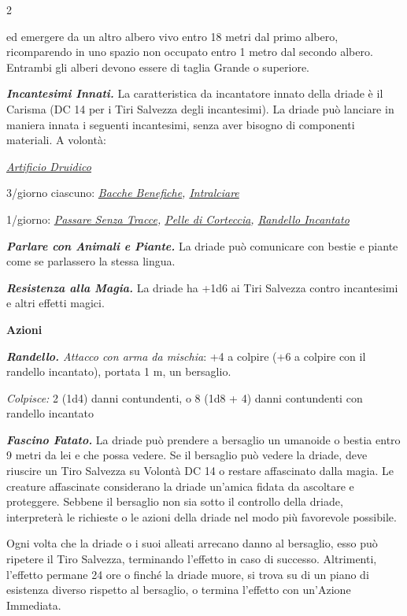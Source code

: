 \begin{multicols}{2}
{ed emergere da un altro albero vivo entro 18 metri dal primo albero, ricomparendo in uno spazio non occupato entro 1 metro dal secondo albero. Entrambi gli alberi devono essere di taglia Grande o superiore.

\emph{\textbf{Incantesimi Innati.}} La caratteristica da incantatore innato della driade è il Carisma (DC 14 per i Tiri Salvezza degli incantesimi). La driade può lanciare in maniera innata i seguenti incantesimi, senza aver bisogno di componenti materiali. A volontà:

\emph{\hyperlink{Artificio Druidico}{Artificio Druidico}}

3/giorno ciascuno: \emph{\hyperlink{Bacche Benefiche}{Bacche Benefiche}, \hyperlink{Intralciare}{Intralciare}}

1/giorno: \emph{\hyperlink{Passare Senza Tracce}{Passare Senza Tracce}, \hyperlink{Pelle di Corteccia}{Pelle di Corteccia}, \hyperlink{Randello Incantato}{Randello Incantato}}

\emph{\textbf{Parlare con Animali e Piante.}} La driade può comunicare con bestie e piante come se parlassero la stessa lingua.

\emph{\textbf{Resistenza alla Magia.}} La driade ha +1d6 ai Tiri Salvezza contro incantesimi e altri effetti magici.


\textbf{Azioni}

\emph{\textbf{Randello.} Attacco con arma da mischia}: +4 a colpire (+6 a colpire con il randello incantato), portata 1 m, un bersaglio.

\emph{Colpisce:} 2 (1d4) danni contundenti, o 8 (1d8 + 4) danni contundenti con randello incantato

\emph{\textbf{Fascino Fatato.}} La driade può prendere a bersaglio un umanoide o bestia entro 9 metri da lei e che possa vedere. Se il bersaglio può vedere la driade, deve riuscire un Tiro Salvezza su Volontà DC 14 o restare affascinato dalla magia. Le creature affascinate considerano la driade un'amica fidata da ascoltare e proteggere. Sebbene il bersaglio non sia sotto il controllo della driade, interpreterà le richieste o le azioni della driade nel modo più favorevole possibile.

Ogni volta che la driade o i suoi alleati arrecano danno al bersaglio, esso può ripetere il Tiro Salvezza, terminando l'effetto in caso di successo. Altrimenti, l'effetto permane 24 ore o finché la driade muore, si trova su di un piano di esistenza diverso rispetto al bersaglio, o termina l'effetto con un'Azione Immediata.

}
\end{multicols}
